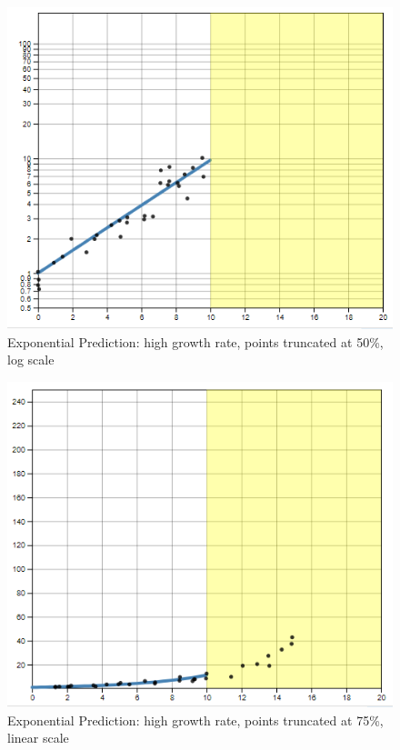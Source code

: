\documentclass[print]{nuthesis}
\begin{document}
\begin{figure}[tbp]

{\centering \includegraphics[width=0.65\linewidth,]{images/02-you-draw-it/high-10-log} 

}

\caption{Exponential Prediction: high growth rate, points truncated at 50\%, log scale}\label{fig:high-10-log}
\end{figure}

\begin{figure}[tbp]

{\centering \includegraphics[width=0.65\linewidth,]{images/02-you-draw-it/high-15-linear} 

}

\caption{Exponential Prediction: high growth rate, points truncated at 75\%, linear scale}\label{fig:high-15-linear}
\end{figure}
\end{document}
